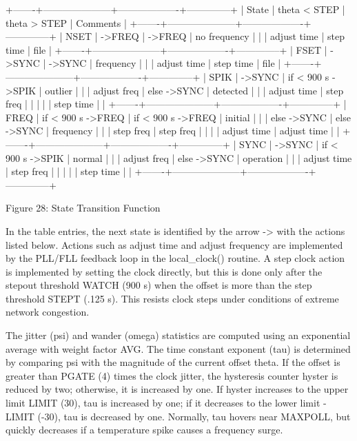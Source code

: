   +-------+---------------------+-------------------+--------------+
  | State | theta < STEP        | theta > STEP      | Comments     |
  +-------+---------------------+-------------------+--------------+
  | NSET  | ->FREQ              | ->FREQ            | no frequency |
  |       | adjust time         | step time         | file         |
  +-------+---------------------+-------------------+--------------+
  | FSET  | ->SYNC              | ->SYNC            | frequency    |
  |       | adjust time         | step time         | file         |
  +-------+---------------------+-------------------+--------------+
  | SPIK  | ->SYNC              | if < 900 s ->SPIK | outlier      |
  |       | adjust freq         | else ->SYNC       | detected     |
  |       | adjust time         | step freq         |              |
  |       |                     | step time         |              |
  +-------+---------------------+-------------------+--------------+
  | FREQ  | if < 900 s ->FREQ   | if < 900 s ->FREQ | initial      |
  |       | else ->SYNC         | else ->SYNC       | frequency    |
  |       | step freq           | step freq         |              |
  |       | adjust time         | adjust time       |              |
  +-------+---------------------+-------------------+--------------+
  | SYNC  | ->SYNC              | if < 900 s ->SPIK | normal       |
  |       | adjust freq         | else ->SYNC       | operation    |
  |       | adjust time         | step freq         |              |
  |       |                     | step time         |              |
  +-------+---------------------+-------------------+--------------+

                Figure 28: State Transition Function

In the table entries, the next state is identified by the arrow ->
with the actions listed below.  Actions such as adjust time and
adjust frequency are implemented by the PLL/FLL feedback loop in the
local\_clock() routine.  A step clock action is implemented by setting
the clock directly, but this is done only after the stepout threshold
WATCH (900 s) when the offset is more than the step threshold STEPT
(.125 s).  This resists clock steps under conditions of extreme
network congestion.

The jitter (psi) and wander (omega) statistics are computed using an
exponential average with weight factor AVG.  The time constant
exponent (tau) is determined by comparing psi with the magnitude of
the current offset theta.  If the offset is greater than PGATE (4)
times the clock jitter, the hysteresis counter hyster is reduced by
two; otherwise, it is increased by one.  If hyster increases to the
upper limit LIMIT (30), tau is increased by one; if it decreases to
the lower limit -LIMIT (-30), tau is decreased by one.  Normally, tau
hovers near MAXPOLL, but quickly decreases if a temperature spike
causes a frequency surge.
